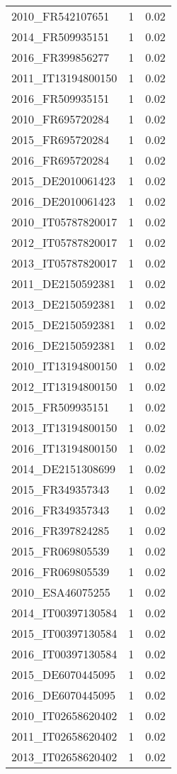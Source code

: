 \begin{table*}[htbp]
\begin{tabular}{lrr}
2010_FR542107651 & 1 & 0.02 \\
2014_FR509935151 & 1 & 0.02 \\
2016_FR399856277 & 1 & 0.02 \\
2011_IT13194800150 & 1 & 0.02 \\
2016_FR509935151 & 1 & 0.02 \\
2010_FR695720284 & 1 & 0.02 \\
2015_FR695720284 & 1 & 0.02 \\
2016_FR695720284 & 1 & 0.02 \\
2015_DE2010061423 & 1 & 0.02 \\
2016_DE2010061423 & 1 & 0.02 \\
2010_IT05787820017 & 1 & 0.02 \\
2012_IT05787820017 & 1 & 0.02 \\
2013_IT05787820017 & 1 & 0.02 \\
2011_DE2150592381 & 1 & 0.02 \\
2013_DE2150592381 & 1 & 0.02 \\
2015_DE2150592381 & 1 & 0.02 \\
2016_DE2150592381 & 1 & 0.02 \\
2010_IT13194800150 & 1 & 0.02 \\
2012_IT13194800150 & 1 & 0.02 \\
2015_FR509935151 & 1 & 0.02 \\
2013_IT13194800150 & 1 & 0.02 \\
2016_IT13194800150 & 1 & 0.02 \\
2014_DE2151308699 & 1 & 0.02 \\
2015_FR349357343 & 1 & 0.02 \\
2016_FR349357343 & 1 & 0.02 \\
2016_FR397824285 & 1 & 0.02 \\
2015_FR069805539 & 1 & 0.02 \\
2016_FR069805539 & 1 & 0.02 \\
2010_ESA46075255 & 1 & 0.02 \\
2014_IT00397130584 & 1 & 0.02 \\
2015_IT00397130584 & 1 & 0.02 \\
2016_IT00397130584 & 1 & 0.02 \\
2015_DE6070445095 & 1 & 0.02 \\
2016_DE6070445095 & 1 & 0.02 \\
2010_IT02658620402 & 1 & 0.02 \\
2011_IT02658620402 & 1 & 0.02 \\
2013_IT02658620402 & 1 & 0.02 \\

\end{tabular}
\end{table*}
